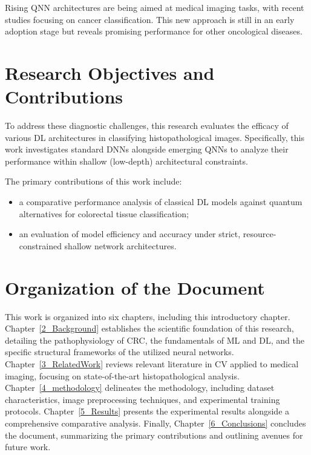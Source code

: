 Rising \gls{QNN} architectures are being aimed at medical imaging tasks, with recent studies focusing on cancer classification. This new approach is still in an early adoption stage but reveals promising performance for other oncological diseases.

\section{Research Objectives and Contributions}
\label{sec_goals}

To address these diagnostic challenges, this research evaluates the efficacy of various \gls{DL} architectures in classifying histopathological images. Specifically, this work investigates standard \glspl{DNN} alongside emerging \glspl{QNN} to analyze their performance within shallow (low-depth) architectural constraints. 

The primary contributions of this work include:
\begin{itemize}
    \item a comparative performance analysis of classical \gls{DL} models against quantum alternatives for colorectal tissue classification;
    \item an evaluation of model efficiency and accuracy under strict, resource-constrained shallow network architectures.
\end{itemize}

\section{Organization of the Document}
\label{sec_about}

This work is organized into six chapters, including this introductory chapter. Chapter~\ref{2_Background} establishes the scientific foundation of this research, detailing the pathophysiology of \gls{CRC}, the fundamentals of \gls{ML} and \gls{DL}, and the specific structural frameworks of the utilized neural networks. Chapter~\ref{3_RelatedWork} reviews relevant literature in \gls{CV} applied to medical imaging, focusing on state-of-the-art histopathological analysis. Chapter~\ref{4_methodology} delineates the methodology, including dataset characteristics, image preprocessing techniques, and experimental training protocols. Chapter~\ref{5_Results} presents the experimental results alongside a comprehensive comparative analysis. Finally, Chapter~\ref{6_Conclusions} concludes the document, summarizing the primary contributions and outlining avenues for future work.
